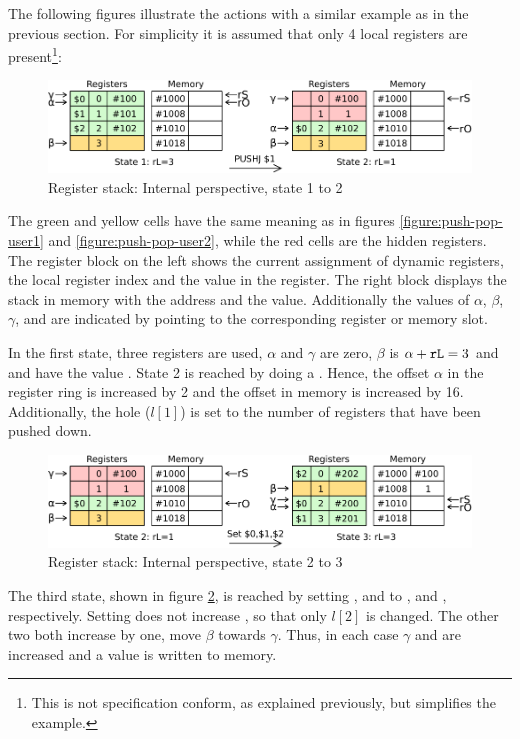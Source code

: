 The following figures illustrate the actions with a similar example as in the previous section. For simplicity it is assumed that only 4 local registers are present\footnote{This is not specification conform, as explained previously, but simplifies the example.}:
\begin{figure}[H]
	\centering
	\includegraphics[width=\textwidth]{img/push-pop-internal1-crop.pdf}
	\caption{Register stack: Internal perspective, state 1 to 2}
	\label{figure:push-pop-internal1}
\end{figure}
\noindent The green and yellow cells have the same meaning as in figures \ref{figure:push-pop-user1} and \ref{figure:push-pop-user2}, while the red cells are the hidden registers. The register block on the left shows the current assignment of dynamic registers, the local register index and the value in the register. The right block displays the stack in memory with the address and the value. Additionally the values of $\alpha$, $\beta$, $\gamma$,  and  are indicated by pointing to the corresponding register or memory slot.

In the first state, three registers are used, $\alpha$ and $\gamma$ are zero, $\beta$ is $\alpha+{\tt rL} = 3$ and  and  have the value . State 2 is reached by doing a . Hence, the offset $\alpha$ in the register ring is increased by 2 and the offset  in memory is increased by 16. Additionally, the hole ($l[1]$) is set to the number of registers that have been pushed down.

\begin{figure}[H]
	\centering
	\includegraphics[width=\textwidth]{img/push-pop-internal2-crop.pdf}
	\caption{Register stack: Internal perspective, state 2 to 3}
	\label{figure:push-pop-internal2}
\end{figure}
\noindent The third state, shown in figure \ref{figure:push-pop-internal2}, is reached by setting ,  and  to ,  and , respectively. Setting  does not increase , so that only $l[2]$ is changed. The other two both increase  by one, \ie move $\beta$ towards $\gamma$. Thus, in each case $\gamma$ and  are increased and a value is written to memory.

